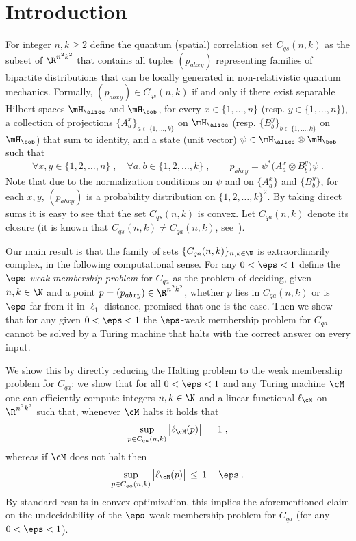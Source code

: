 \section{Introduction}
\label{sec:intro}

For integer $n,k\geq 2$ define the quantum (spatial) correlation set $C_{qs}(n,k)$ as the subset of $\R^{n^2k^2}$ that contains all tuples $(p_{abxy})$ representing families of bipartite distributions that can be locally generated in non-relativistic quantum mechanics. Formally, $(p_{abxy}) \in C_{qs}(n,k)$ if and only if there exist separable Hilbert spaces $\mH_\alice$ and $\mH_\bob$, for every $x\in\{1,\ldots,n\}$ (resp. $y\in\{1,\ldots,n\}$), a collection of projections $\{A^x_a\}_{a\in\{1,\ldots,k\}}$ on $\mH_\alice$ (resp. $\{B^y_b\}_{b\in\{1,\ldots,k\}}$ on $\mH_\bob$) that sum to identity, and a state (unit vector) $\psi \in \mH_\alice \otimes \mH_\bob$ such that 
\begin{equation}\label{eq:intro-qs}
  \forall x,y\in \{1, 2, \ldots, n\}\;,\quad\forall a,b\in\{1, 2, \ldots, k\}\;,
  \qquad p_{abxy} = \psi^* \big( A^x_a \otimes B^y_b\big) \psi\;.
\end{equation}
Note that due to the normalization conditions on $\psi$ and on $\{A^x_a\}$ and
$\{B^y_b\}$, for each $x,y$, $(p_{abxy})$ is a probability distribution on
$\{1, 2, \ldots, k\}^2$.
By taking direct sums it is easy to see that the set $C_{qs}(n,k)$ is convex. Let $C_{qa}(n,k)$ denote its closure (it is known that $C_{qs}(n,k) \neq C_{qa}(n,k)$, see~\cite{slofstra2019set}).


Our main result is that the family of sets $\{C_{qa}(n,k)\}_{n,k \in \N}$ is extraordinarily complex, in the following computational sense. For any $0<\eps<1$ define the $\eps$-\emph{weak membership problem} for $C_{qa}$ as the problem of deciding, given $n,k \in \N$ and a point $p=(p_{abxy}) \in \R^{n^2 k^2}$, whether $p$ lies in $C_{qa}(n,k)$ or is $\eps$-far from it in $\ell_1$ distance, promised that one is the case. Then we show that for any given $0<\eps<1$ the  $\eps$-{weak membership problem} for $C_{qa}$ cannot be solved by a Turing machine that halts with the correct answer on every input.

We show this by directly reducing the Halting problem to the weak membership problem for $C_{qa}$: we show that for all $0 < \eps < 1$ and any Turing machine $\cM$ one can efficiently compute integers $n,k\in \N$ and a linear functional $\ell_\cM$ on $\R^{n^2k^2}$ such that, whenever $\cM$ halts it holds that 
\begin{equation}\label{eq:intro-win-1}
\sup_{p\in C_{qa}(n,k)} \big|\ell_\cM(p)\big| \,=\,1\;,
\end{equation}
 whereas if $\cM$ does not halt then 
\begin{equation}\label{eq:intro-win-2}
\sup_{p\in C_{qa}(n,k)} \big|\ell_\cM(p)\big| \,\leq\, 1 - \eps\;.
\end{equation}
By standard results in convex optimization, this implies the aforementioned claim on the undecidability of the $\eps$-weak membership problem for $C_{qa}$ (for any $0<\eps<1$). 

